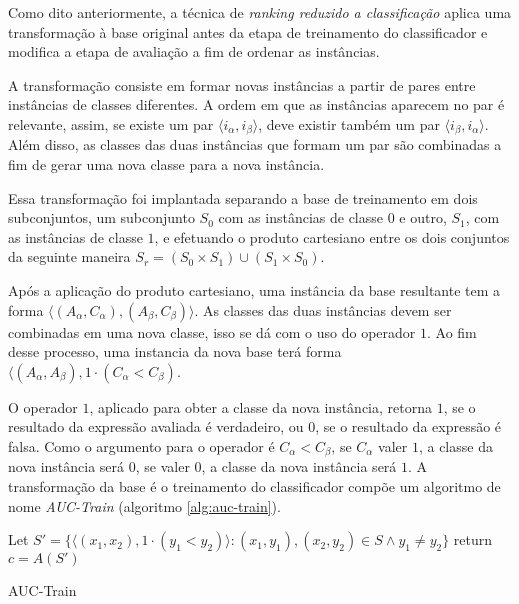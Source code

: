 Como dito anteriormente, a técnica de \emph{ranking reduzido a classificação} aplica uma transformação à base original antes da etapa de treinamento do classificador e modifica a etapa de avaliação a fim de ordenar as instâncias.

A transformação consiste em formar novas instâncias a partir de pares entre instâncias de classes diferentes. A ordem em que as instâncias aparecem no par é relevante, assim, se existe um par $\langle i_\alpha, i_\beta \rangle$, deve existir também um par $\langle i_\beta, i_\alpha \rangle$. Além disso, as classes das duas instâncias que formam um par são combinadas a fim de gerar uma nova classe para a nova instância.

Essa transformação foi implantada separando a base de treinamento em dois subconjuntos, um subconjunto $S_0$ com as instâncias de classe $0$ e outro, $S_1$, com as instâncias de classe $1$, e efetuando o produto cartesiano entre os dois conjuntos da seguinte maneira $S_r = (S_0 \times S_1) \cup (S_1 \times S_0)$.

Após a aplicação do produto cartesiano, uma instância da base resultante tem a forma $\langle (A_\alpha, C_\alpha), (A_\beta, C_\beta) \rangle$. As classes das duas instâncias devem ser combinadas em uma nova classe, isso se dá com o uso do operador $1$. Ao fim desse processo, uma instancia da nova base terá forma $\langle (A_\alpha, A_\beta), 1 \cdot (C_\alpha < C_\beta)$.

O operador $1$, aplicado para obter a classe da nova instância, retorna $1$, se o resultado da expressão avaliada é verdadeiro, ou $0$, se o resultado da expressão é falsa. Como o argumento para o operador é $C_\alpha < C_\beta$, se $C_\alpha$ valer $1$, a classe da nova instância será $0$, se valer $0$, a classe da nova instância será $1$. A transformação da base é o treinamento do classificador compõe um algoritmo de nome \emph{AUC-Train} (algoritmo \ref{alg:auc-train}).

\begin{algorithm}
    \begin{algorithmic}

        \STATE Let $S' = \{\langle (x_1, x_2), 1 \cdot (y_1 < y_2) \rangle : (x_1, y_1), (x_2, y_2) \in S \wedge y_1 \neq y_2\}$
        \STATE return $c = A(S')$

        \caption{AUC-Train}
        \label{alg:auc-train}

    \end{algorithmic}
\end{algorithm}

